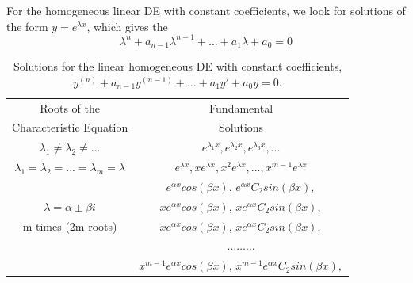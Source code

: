 \documentclass[12pt, a4paper, oneside, openright, titlepage]{book}
\begin{document}


\begin{defn}
        For the homogeneous linear DE with constant coefficients, we look for solutions of the form $y = e^{\lambda x}$, which gives the  \begin{equation}
                \lambda^n+a_{n-1}\lambda^{n-1}+...+a_1\lambda+a_0 = 0
        \end{equation}
\end{defn}




\bgroup
\def\arraystretch{1.5}
\begin{table}[H]
        \centering
        \caption{Solutions for the linear homogeneous DE with constant coefficients, $y^{(n)}+a_{n-1}y^{(n-1)}+\hdots+a_1y'+a_0y = 0$.}
        \begin{tabular}{c|c}
                Roots of the & Fundamental \\ 
                Characteristic Equation & Solutions \\ \hline
                $\lambda_1 \neq \lambda_2\neq ...$ & $e^{\lambda_1 x},e^{\lambda_2 x},e^{\lambda_3 x},...$ \\
                $\lambda_1 = \lambda_2 =...=\lambda_m= \lambda$ & $e^{\lambda x},xe^{\lambda x},x^2e^{\lambda x},...,x^{m-1}e^{\lambda x}$ \\
                & $e^{\alpha x}cos(\beta x)$, $e^{\alpha x}C_2sin(\beta x),$ \\
                $\lambda = \alpha \pm \beta i$& $xe^{\alpha x}cos(\beta x)$, $xe^{\alpha x}C_2sin(\beta x),$ \\
                m times (2m roots) & $xe^{\alpha x}cos(\beta x)$, $xe^{\alpha x}C_2sin(\beta x),$ \\
                & $\hdots\hdots\hdots$ \\
                & $x^{m-1}e^{\alpha x}cos(\beta x)$, $x^{m-1}e^{\alpha x}C_2sin(\beta x),$
        \end{tabular}
\end{table}
\egroup


\end{document}
